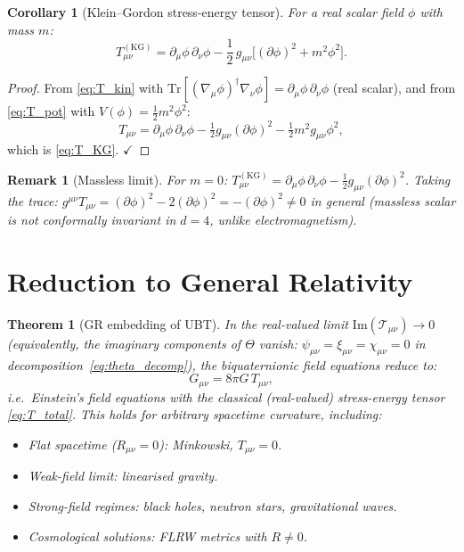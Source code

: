 \documentclass[12pt]{article}
\newtheorem{theorem}[definition]{Theorem}
\newtheorem{corollary}[definition]{Corollary}
\newtheorem{remark}[definition]{Remark}
\newcommand{\Tr}{\mathrm{Tr}}
\newcommand{\im}{\mathrm{Im}}
\newcommand{\calT}{\mathcal{T}}
\begin{document}
\begin{corollary}[Klein--Gordon stress-energy tensor]
\label{cor:kg}
For a real scalar field $\phi$ with mass $m$:
\begin{equation}
  \label{eq:T_KG}
  \boxed{
    T_{\mu\nu}^{(\mathrm{KG})}
    = \partial_\mu\phi\,\partial_\nu\phi
      - \frac{1}{2}\,g_{\mu\nu}\bigl[(\partial\phi)^2 + m^2\phi^2\bigr].
  }
\end{equation}
\end{corollary}

\begin{proof}
From \eqref{eq:T_kin} with $\Tr[(\nabla_\mu\phi)^\dagger\nabla_\nu\phi]
= \partial_\mu\phi\,\partial_\nu\phi$ (real scalar),
and from \eqref{eq:T_pot} with $V(\phi) = \tfrac{1}{2}m^2\phi^2$:
\[
  T_{\mu\nu}
  = \partial_\mu\phi\,\partial_\nu\phi
    - \tfrac{1}{2}g_{\mu\nu}(\partial\phi)^2
    - \tfrac{1}{2}m^2 g_{\mu\nu}\phi^2,
\]
which is \eqref{eq:T_KG}. $\checkmark$
\end{proof}

\begin{remark}[Massless limit]
For $m = 0$: $T^{(\mathrm{KG})}_{\mu\nu} = \partial_\mu\phi\,\partial_\nu\phi
- \tfrac{1}{2}g_{\mu\nu}(\partial\phi)^2$.
Taking the trace: $g^{\mu\nu}T_{\mu\nu} = (\partial\phi)^2 - 2(\partial\phi)^2 = -(\partial\phi)^2 \neq 0$
in general (massless scalar is not conformally invariant in $d=4$,
unlike electromagnetism).
\end{remark}

\section{Reduction to General Relativity}
\label{sec:gr_reduction}

\begin{theorem}[GR embedding of UBT]
\label{thm:gr_embedding}
In the real-valued limit $\im(\calT_{\mu\nu}) \to 0$ (equivalently,
the imaginary components of $\Theta$ vanish: $\psi_{\mu\nu} = \xi_{\mu\nu}
= \chi_{\mu\nu} = 0$ in decomposition~\eqref{eq:theta_decomp}), the
biquaternionic field equations reduce to:
\begin{equation}
  G_{\mu\nu} = 8\pi G\, T_{\mu\nu},
\end{equation}
i.e.\ Einstein's field equations with the classical (real-valued) stress-energy
tensor \eqref{eq:T_total}.  This holds for arbitrary spacetime curvature,
including:
\begin{itemize}
  \item Flat spacetime ($R_{\mu\nu} = 0$): Minkowski, $T_{\mu\nu} = 0$.
  \item Weak-field limit: linearised gravity.
  \item Strong-field regimes: black holes, neutron stars, gravitational waves.
  \item Cosmological solutions: FLRW metrics with $R \neq 0$.
\end{itemize}
\end{theorem}
\end{document}
